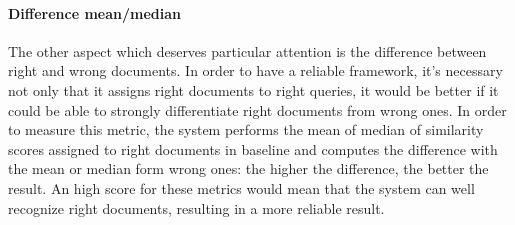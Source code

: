 \documentclass[\main/main.tex]{subfiles}
\begin{document}
\paragraph{Difference mean/median} The other aspect which deserves particular attention is the difference between right and wrong documents. In order to have a reliable framework, it's necessary not only that it assigns right documents to right queries, it would be better if it could be able to strongly differentiate right documents from wrong ones. In order to measure this metric, the system performs the mean of median of similarity scores assigned to right documents in baseline and computes the difference with the mean or median form wrong ones: the higher the difference, the better the result. An high score for these metrics would mean that the system can well recognize right documents, resulting in a more reliable result. 
\end{document}
